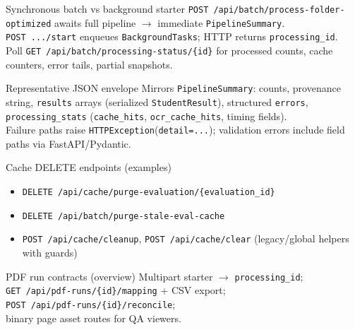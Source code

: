 \documentclass[aspectratio=169]{beamer}
\begin{document}
\begin{frame}{Synchronous batch vs background starter}
  \small
  \texttt{POST /api/batch/process-folder-optimized} awaits full pipeline $\rightarrow$ immediate \texttt{PipelineSummary}.\\
  \texttt{POST .../start} enqueues \texttt{BackgroundTasks}; HTTP returns \texttt{processing\_id}.\\
  Poll \texttt{GET /api/batch/processing-status/\{id\}} for processed counts, cache counters, error tails, partial snapshots.
\end{frame}

\begin{frame}{Representative JSON envelope}
  \tiny
  Mirrors \texttt{PipelineSummary}: counts, provenance string, \texttt{results} arrays (serialized \texttt{StudentResult}), structured \texttt{errors}, \texttt{processing\_stats} (\texttt{cache\_hits}, \texttt{ocr\_cache\_hits}, timing fields).\\
  Failure paths raise \texttt{HTTPException}(\texttt{detail=...}); validation errors include field paths via FastAPI/Pydantic.
\end{frame}

\begin{frame}{Cache DELETE endpoints (examples)}
  \tiny
  \begin{itemize}\setlength\itemsep{0.1em}
    \item \texttt{DELETE /api/cache/purge-evaluation/\{evaluation\_id\}}
    \item \texttt{DELETE /api/batch/purge-stale-eval-cache}
    \item \texttt{POST /api/cache/cleanup}, \texttt{POST /api/cache/clear} (legacy/global helpers with guards)
  \end{itemize}
\end{frame}

\begin{frame}{PDF run contracts (overview)}
  \tiny
  Multipart starter $\rightarrow$ \texttt{processing\_id};\\
  \texttt{GET /api/pdf-runs/\{id\}/mapping} + CSV export;\\
  \texttt{POST /api/pdf-runs/\{id\}/reconcile};\\
  binary page asset routes for QA viewers.
\end{frame}
\end{document}
